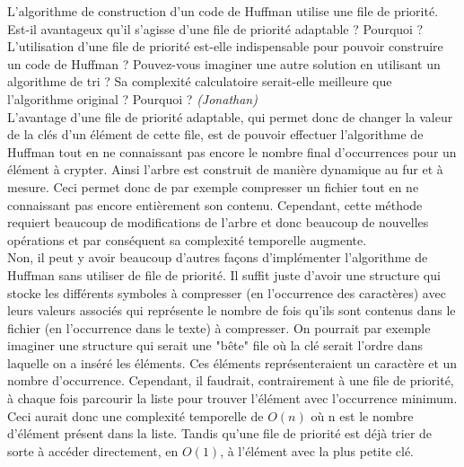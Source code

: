 L'algorithme de construction d'un code de Huffman utilise une file de priorité.
Est-il avantageux qu'il s'agisse d'une file de priorité adaptable ? Pourquoi ?
L'utilisation d'une file de priorité est-elle indispensable pour pouvoir construire
un code de Huffman ? Pouvez-vous imaginer une autre solution en utilisant un algorithme
de tri ? Sa complexité calculatoire serait-elle meilleure que l'algorithme
original ? Pourquoi ? \textit{(Jonathan)} \\

L'avantage d'une file de priorité adaptable, qui permet donc de changer la valeur de la clés d'un élément de cette file, est de pouvoir effectuer l'algorithme de Huffman tout en ne connaissant pas encore le nombre final d'occurrences pour un élément à crypter. Ainsi l'arbre est construit de manière dynamique au fur et à mesure. Ceci permet donc de par exemple compresser un fichier tout en ne connaissant pas encore entièrement son contenu.
Cependant, cette méthode requiert beaucoup de modifications de l'arbre et donc beaucoup de nouvelles opérations et par conséquent sa complexité temporelle augmente.\\

Non, il peut y avoir beaucoup d'autres façons d'implémenter l'algorithme de Huffman sans utiliser de file de priorité. Il suffit juste d'avoir une structure qui stocke les différents symboles à compresser (en l'occurrence des caractères) avec leurs valeurs associés qui représente le nombre de fois qu'ils sont contenus dans le fichier (en l'occurrence dans le texte) à compresser. On pourrait par exemple imaginer une structure qui serait une "bête" file où la clé serait l'ordre dans laquelle on a inséré les éléments. Ces éléments représenteraient un caractère et un nombre d'occurrence. Cependant, il faudrait, contrairement à une file de priorité, à chaque fois parcourir la liste pour trouver l'élément avec l'occurrence minimum. Ceci aurait donc une complexité temporelle de $O(n)$ où n est le nombre d'élément présent dans la liste. Tandis qu'une file de priorité est déjà trier de sorte à accéder directement, en $O(1)$, à l'élément avec la plus petite clé.